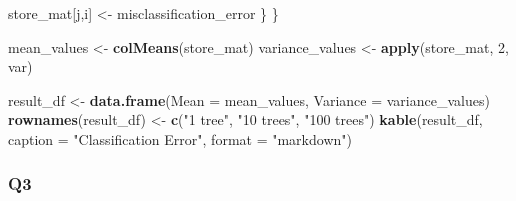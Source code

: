\documentclass[
]{article}
\newenvironment{Shaded}{\begin{snugshade}}{\end{snugshade}}
\newcommand{\AttributeTok}[1]{\textcolor[rgb]{0.13,0.29,0.53}{#1}}
\newcommand{\DecValTok}[1]{\textcolor[rgb]{0.00,0.00,0.81}{#1}}
\newcommand{\FunctionTok}[1]{\textcolor[rgb]{0.13,0.29,0.53}{\textbf{#1}}}
\newcommand{\NormalTok}[1]{#1}
\newcommand{\OtherTok}[1]{\textcolor[rgb]{0.56,0.35,0.01}{#1}}
\newcommand{\StringTok}[1]{\textcolor[rgb]{0.31,0.60,0.02}{#1}}
\begin{document}
\begin{Shaded}
\begin{Highlighting}[]
\NormalTok{    store\_mat[j,i] }\OtherTok{\textless{}{-}}\NormalTok{ misclassification\_error}
\NormalTok{  \}}
\NormalTok{\}}

\NormalTok{mean\_values }\OtherTok{\textless{}{-}} \FunctionTok{colMeans}\NormalTok{(store\_mat)}
\NormalTok{variance\_values }\OtherTok{\textless{}{-}} \FunctionTok{apply}\NormalTok{(store\_mat, }\DecValTok{2}\NormalTok{, var)}

\NormalTok{result\_df }\OtherTok{\textless{}{-}} \FunctionTok{data.frame}\NormalTok{(}\AttributeTok{Mean =}\NormalTok{ mean\_values, }\AttributeTok{Variance =}\NormalTok{ variance\_values)}
\FunctionTok{rownames}\NormalTok{(result\_df) }\OtherTok{\textless{}{-}} \FunctionTok{c}\NormalTok{(}\StringTok{"1 tree"}\NormalTok{, }\StringTok{"10 trees"}\NormalTok{, }\StringTok{"100 trees"}\NormalTok{)}
\FunctionTok{kable}\NormalTok{(result\_df, }\AttributeTok{caption =} \StringTok{"Classification Error"}\NormalTok{, }\AttributeTok{format =} \StringTok{"markdown"}\NormalTok{)}
\end{Highlighting}
\end{Shaded}

\hypertarget{q3-1}{%
\subsubsection{Q3}\label{q3-1}}
\end{document}
